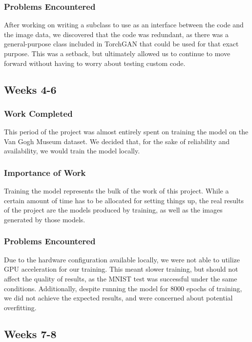\documentclass[11pt,letterpaper]{article}
\begin{document}
			\subsubsection{Problems Encountered}
				After working on writing a subclass to use as an interface between the code and the image data, we discovered that the code was redundant, as there was a general-purpose class included in TorchGAN that could be used for that exact purpose.
				This was a setback, but ultimately allowed us to continue to move forward without having to worry about testing custom code.

		\subsection{Weeks 4-6}
			\subsubsection{Work Completed}
				This period of the project was almost entirely spent on training the model on the Van Gogh Museum dataset.
				We decided that, for the sake of reliability and availability, we would train the model locally.
			\subsubsection{Importance of Work}
				Training the model represents the bulk of the work of this project.
				While a certain amount of time has to be allocated for setting things up, the real results of the project are the models produced by training, as well as the images generated by those models.
			\subsubsection{Problems Encountered}
				Due to the hardware configuration available locally, we were not able to utilize GPU acceleration for our training.
				This meant slower training, but should not affect the quality of results, as the MNIST test was successful under the same conditions.
				Additionally, despite running the model for 8000 epochs of training, we did not achieve the expected results, and were concerned about potential overfitting.

		\subsection{Weeks 7-8}
\end{document}
